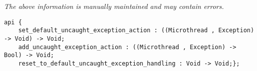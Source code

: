 \label{api:Uncaught\_Exception\_Reporting}

{\tiny \it The above information is manually maintained and may contain errors.}
\begin{verbatim}
api {
    set_default_uncaught_exception_action : ((Microthread , Exception) -> Void) -> Void;
    add_uncaught_exception_action : ((Microthread , Exception) -> Bool) -> Void;
    reset_to_default_uncaught_exception_handling : Void -> Void;};
\end{verbatim}
